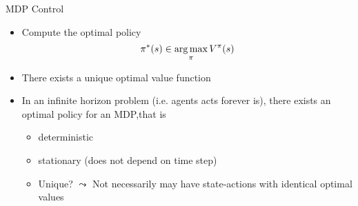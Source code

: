 \documentclass[aspectratio=169]{../latex_main/tntbeamer}  %
\begin{document}
\begin{frame}[c]{MDP Control}

\begin{itemize}
	\item Compute the optimal policy
	$$ \pi^*(s)  \in \operatorname*{arg\,max}_\pi V^\pi(s)$$
	\item There \alert{exists a unique optimal value function}
	\item In an infinite horizon problem (i.e. agents acts forever is), there exists an optimal policy for an MDP,\newline that is 
	\begin{itemize}
		\item deterministic
		\item stationary (does not depend on time step)
		\item Unique? $\leadsto$ Not necessarily may have state-actions with identical optimal values
	\end{itemize}
\end{itemize}

\end{frame}
\end{document}
